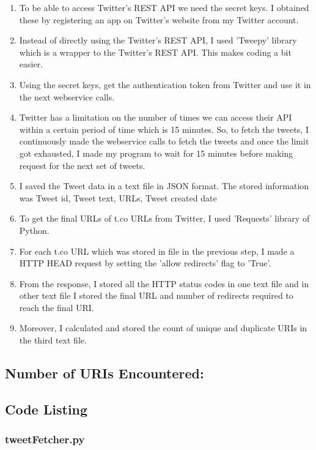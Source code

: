 \begin{enumerate}

\item To be able to access Twitter's REST API we need the secret keys. I obtained these by registering an app on Twitter's website from my Twitter account.
\item Instead of directly using the Twitter's REST API, I used 'Tweepy' library which is a wrapper to the Twitter's REST API. This makes coding a bit easier.
\item Using the secret keys, get the authentication token from Twitter and use it in the next webservice calls.
\item Twitter has a limitation on the number of times we can access their API within a certain period of time which is 15 minutes. So, to fetch the tweets, I continuously made the webservice calls to fetch the tweets and once the limit got exhausted, I made my program to wait for 15 minutes before making request for the next set of tweets.
\item I saved the Tweet data in a text file in JSON format. The stored information was Tweet id, Tweet text, URLs, Tweet created date
\item To get the final URLs of t.co URLs from Twitter, I used 'Requests' library of Python.
\item For each t.co URL which was stored in file in the previous step, I made a HTTP HEAD request by setting the 'allow redirects' flag to 'True'. 
\item From the response, I stored all the HTTP status codes in one text file and in other text file I stored the final URL and number of redirects required to reach the final URI.
\item Moreover, I calculated and stored the count of unique and duplicate URIs in the third text file.

\end{enumerate}
\newpage

\subsection{Number of URIs Encountered:}

\begingroup
\obeylines

\endgroup

\subsection{Code Listing}
\subsubsection{tweetFetcher.py}

